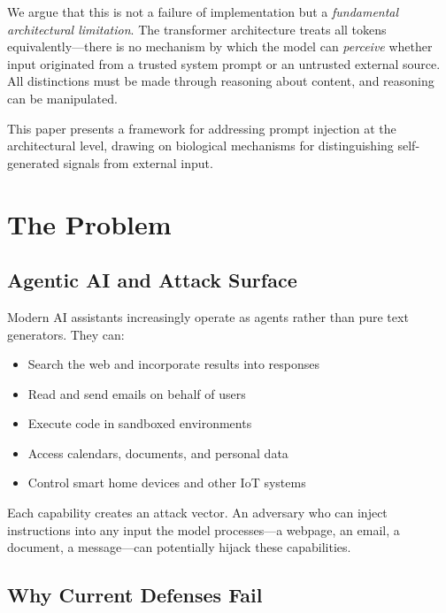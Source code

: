 \documentclass[11pt,a4paper]{article}
\theoremstyle{plain}
\theoremstyle{definition}
\theoremstyle{remark}
\begin{document}
We argue that this is not a failure of implementation but a \emph{fundamental architectural limitation}. The transformer architecture treats all tokens equivalently---there is no mechanism by which the model can \emph{perceive} whether input originated from a trusted system prompt or an untrusted external source. All distinctions must be made through reasoning about content, and reasoning can be manipulated.

This paper presents a framework for addressing prompt injection at the architectural level, drawing on biological mechanisms for distinguishing self-generated signals from external input.

\section{The Problem}

\subsection{Agentic AI and Attack Surface}

Modern AI assistants increasingly operate as agents rather than pure text generators. They can:

\begin{itemize}[noitemsep]
    \item Search the web and incorporate results into responses
    \item Read and send emails on behalf of users
    \item Execute code in sandboxed environments
    \item Access calendars, documents, and personal data
    \item Control smart home devices and other IoT systems
\end{itemize}

Each capability creates an attack vector. An adversary who can inject instructions into any input the model processes---a webpage, an email, a document, a message---can potentially hijack these capabilities.

\subsection{Why Current Defenses Fail} \label{sec:current-defenses}
\end{document}
